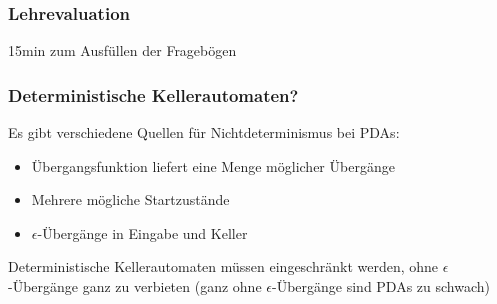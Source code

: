 \documentclass[aspectratio=1610,onlymath]{beamer}
\begin{document}
% 
% 
% 
% 

\begin{frame}\frametitle{Lehrevaluation}


\begin{center}
15min zum Ausfüllen der Fragebögen
\end{center}

\end{frame}


\begin{frame}\frametitle{Deterministische Kellerautomaten?}

Es gibt verschiedene Quellen für Nichtdeterminismus bei PDAs\pause:
\begin{itemize}
\item Übergangsfunktion liefert eine Menge möglicher Übergänge\pause
\item Mehrere mögliche Startzustände\pause
\item $\epsilon$-Übergänge in Eingabe und Keller\medskip

\end{itemize}

Deterministische Kellerautomaten müssen eingeschränkt werden, ohne 
$\epsilon$-Übergänge ganz zu verbieten (ganz ohne $\epsilon$-Übergänge sind PDAs zu schwach)

\end{frame}
\end{document}
